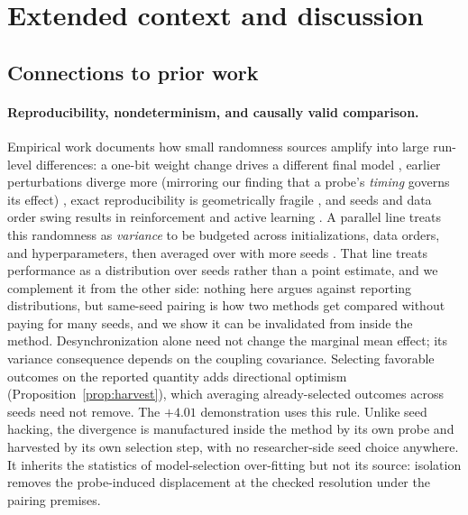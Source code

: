 \section{Extended context and discussion}
\label{sec:extended-context}

\subsection{Connections to prior work}

\paragraph{Reproducibility, nondeterminism, and causally valid comparison.}
Empirical work documents how small randomness sources amplify into large
run-level differences: a one-bit weight change drives a different final model
\citep{summers2021nondeterminism}, earlier perturbations diverge more (mirroring
our finding that a probe's \emph{timing} governs its effect)
\citep{altintas2025butterfly}, exact reproducibility is geometrically fragile
\citep{ly2025riddled}, and seeds and data order swing
results in reinforcement and active learning
\citep{henderson2018deep,ji2023randomness,patterson2024empirical}. A parallel line treats this
randomness as \emph{variance} to be budgeted across initializations, data
orders, and hyperparameters, then averaged over with more seeds
\citep{dodge2020finetuning,bouthillier2021accounting}. That line treats
performance as a distribution over seeds rather than a point estimate, and we
complement it from the other side: nothing here argues against reporting
distributions, but same-seed pairing is how two methods get compared without
paying for many seeds, and we show it can be invalidated from inside the
method. Desynchronization alone need not change the marginal mean effect;
its variance consequence depends on the coupling covariance. Selecting
favorable outcomes on the reported quantity adds directional optimism
(Proposition~\ref{prop:harvest}), which averaging already-selected outcomes
across seeds need not remove. The $+4.01$ demonstration uses this rule.
Unlike seed hacking, the
divergence is manufactured inside the method by its own probe and harvested by
its own selection step, with no researcher-side seed choice anywhere. It
inherits the statistics of model-selection over-fitting
\citep{cawley2010overfitting} but not its source: isolation removes the
probe-induced displacement at the checked resolution under the pairing premises.

